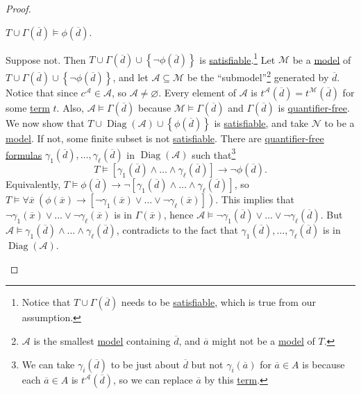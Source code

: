 \begin{proof}
	\begin{claim}
		\(T\cup \Gamma (\overline{d} ) \models \phi (\overline{d} )\).
	\end{claim}
	\begin{explanation}
		Suppose not. Then \(T \cup \Gamma (\overline{d} ) \cup \left\{ \lnot \phi (\overline{d} ) \right\} \) is \hyperref[def:satisfiable]{satisfiable}.\footnote{Notice that \(T \cup \Gamma (\overline{d} )\) needs to be \hyperref[def:satisfiable]{satisfiable}, which is true from our assumption.} Let \(\mathcal{M}\) be a \hyperref[def:model]{model} of \(T \cup \Gamma (\overline{d} ) \cup \left\{ \lnot \phi (\overline{d} ) \right\} \), and let \(\mathcal{A} \subseteq \mathcal{M} \) be the ``submodel''\footnote{\(\mathcal{A} \) is the smallest \hyperref[def:model]{model} containing \(\overline{d} \), and \(\overline{a} \) might not be a \hyperref[def:model]{model} of \(T\).} generated by \(\overline{d} \). Notice that since \(c^{\mathcal{A} } \in \mathcal{A} \), so \(\mathcal{A} \neq \varnothing \). Every element of \(\mathcal{A} \) is \(t^{\mathcal{A} }(\overline{d} ) = t^{\mathcal{M} }(\overline{d} ) \) for some \hyperref[def:term]{term} \(t\). Also, \(\mathcal{A} \models \Gamma (\overline{d} )\) because \(\mathcal{M} \models \Gamma (\overline{d} )\) and \(\Gamma (\overline{d} )\) is \hyperref[not:quantifier-free]{quantifier-free}. We now show that \(T \cup \mathop{\mathrm{Diag}}(\mathcal{A} ) \cup \left\{ \phi (\overline{d} ) \right\} \) is \hyperref[def:satisfiable]{satisfiable}, and take \(\mathcal{N} \) to be a \hyperref[def:model]{model}. If not, some finite subset is not \hyperref[def:satisfiable]{satisfiable}. There are \hyperref[not:quantifier-free]{quantifier-free} \hyperref[def:formula]{formulas} \(\gamma _1(\overline{d} ), \ldots , \gamma _\ell (\overline{d} )\) in \(\mathop{\mathrm{Diag}}(\mathcal{A} ) \) such that\footnote{We can take \(\gamma _i(\overline{d} )\) to be just about \(\overline{d} \) but not \(\gamma _i(\overline{a} )\) for \(\overline{a} \in A\) is because each \(\overline{a} \in A\) is \(t^{\mathcal{A} } (\overline{d} )\), so we can replace \(\overline{a} \) by this \hyperref[def:term]{term}.}
		\[
			T \models \left[ \gamma _1(\overline{d} ) \land \ldots \land \gamma _\ell (\overline{d} ) \right] \to \lnot \phi (\overline{d} ).
		\]
		Equivalently, \(T \models \phi (\overline{d} ) \to \lnot \left[ \gamma _1(\overline{d} ) \land \ldots \land \gamma _\ell (\overline{d} ) \right] \), so \(T \models \forall \overline{x}\ \left( \phi (\overline{x} ) \to \left[ \lnot \gamma _1(\overline{x} ) \lor \ldots \lor \lnot \gamma _\ell (\overline{x} ) \right]  \right) \). This implies that \(\lnot \gamma _1(\overline{x} ) \lor \ldots \lor \lnot \gamma _\ell (\overline{x} )\) is in \(\Gamma (\overline{x} )\), hence \(\mathcal{A} \models \lnot \gamma _1(\overline{d} ) \lor \ldots \lor \lnot \gamma _\ell (\overline{d} )\). But \(\mathcal{A} \models \gamma _1(\overline{d} ) \land \ldots \land \gamma _\ell (\overline{d} )\), contradicts to the fact that \(\gamma _1(\overline{d} ), \ldots , \gamma _\ell (\overline{d} )\) is in \(\mathop{\mathrm{Diag}}(\mathcal{A} ) \).


\end{explanation}
\end{proof}
